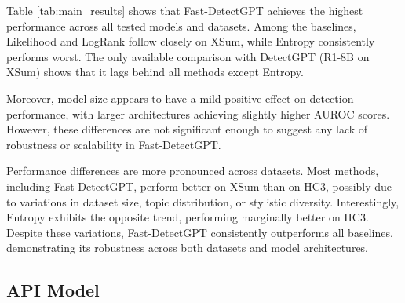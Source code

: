 \documentclass[11pt]{article}
\begin{document}
Table \ref{tab:main_results} shows that Fast-DetectGPT achieves the highest performance across all tested models and datasets. Among the baselines, Likelihood and LogRank follow closely on XSum, while Entropy consistently performs worst. The only available comparison with DetectGPT (R1-8B on XSum) shows that it lags behind all methods except Entropy.

Moreover, model size appears to have a mild positive effect on detection performance, with larger architectures achieving slightly higher AUROC scores. However, these differences are not significant enough to suggest any lack of robustness or scalability in Fast-DetectGPT.

Performance differences are more pronounced across datasets. Most methods, including Fast-DetectGPT, perform better on XSum than on HC3, possibly due to variations in dataset size, topic distribution, or stylistic diversity. Interestingly, Entropy exhibits the opposite trend, performing marginally better on HC3. Despite these variations, Fast-DetectGPT consistently outperforms all baselines, demonstrating its robustness across both datasets and model architectures.

\subsection{API Model}


\end{document}
